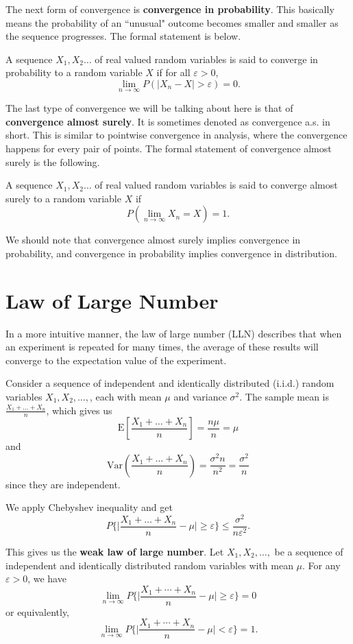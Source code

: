 \documentclass[11pt, a4paper, oneside]{book}
\theoremstyle{definition}
\newcommand{\var}[1]{\text{Var}(#1)}
\newcommand{\E}[1]{\text{E}[#1]}
\begin{document}
\noindent The next form of convergence is \textbf{convergence in probability}. This basically means the probability of an ``unusual" outcome becomes smaller and smaller as the sequence progresses. The formal statement is below.

\noindent A sequence $X_1, X_2 \dots$ of real valued random variables is said to converge in probability to a random variable $X$ if for all $\varepsilon > 0$, \[
\lim_{n\to \infty} P(|X_n - X| > \varepsilon) = 0.
\]

\noindent The last type of convergence we will be talking about here is that of \textbf{convergence almost surely}. It is sometimes denoted as convergence a.s. in short. This is similar to pointwise convergence in analysis, where the convergence happens for every pair of points. The formal statement of convergence almost surely is the following. 

\noindent A sequence $X_1, X_2 \dots$ of real valued random variables is said to converge almost surely to a random variable $X$ if\[
P(\lim_{n\to \infty} X_n = X) = 1.
\]

\noindent We should note that convergence almost surely implies convergence in probability, and convergence in probability implies convergence in distribution. 

\section{Law of Large Number}

\noindent In a more intuitive manner, the law of large number (LLN) describes that when an experiment is repeated for many times, the average of these results will converge to the expectation value of the experiment.

\noindent Consider a sequence of independent and identically distributed (i.i.d.) random variables $X_1, X_2, \dots,$, each with mean $\mu$ and variance $\sigma^2$. The sample mean is $\frac{X_1 + \dots + X_n}{n}$, which gives us\[
\E{\frac{X_1 + \dots + X_n}{n}} = \frac{n\mu}{n} = \mu
\]
and \[
\var{ \frac{X_1 + \dots + X_n}{n}} = \frac{\sigma^2 n}{n^2} =\frac{\sigma^2}{n}
\]
since they are independent. 

\noindent We apply Chebyshev inequality and get \[
P\Big\{ \Big|  \frac{X_1 + \dots + X_n}{n} - \mu \Big|  \ge \varepsilon \Big\} \le \frac{\sigma^2}{n\varepsilon^2}.
\]

\noindent This gives us the \textbf{weak law of large number}. Let $X_1, X_2, \dots,$ be a sequence of independent and identically distributed random variables with mean $\mu$. For any $\varepsilon > 0$, we have\[
\lim_{n \to \infty} P\Big\{\big| \frac{X_1 + \cdots + X_n}{n} - \mu \big| \ge \varepsilon\Big\} = 0
\]
or equivalently, \[
\lim_{n \to \infty} P\Big\{\big| \frac{X_1 + \cdots + X_n}{n} - \mu \big| < \varepsilon\Big\} = 1.
\]
\end{document}
